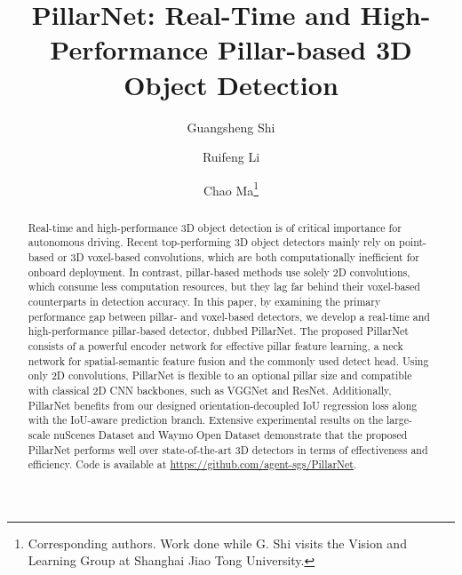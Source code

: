 \documentclass[runningheads]{llncs}
\begin{document}
\pagestyle{headings}
\mainmatter
\def\ECCVSubNumber{4346}  

\title{PillarNet: Real-Time and High-Performance Pillar-based 3D Object Detection} 

\begin{comment}
\titlerunning{ECCV-22 submission ID \ECCVSubNumber} 
\authorrunning{ECCV-22 submission ID \ECCVSubNumber} 
\author{Anonymous ECCV submission}
\institute{Paper ID \ECCVSubNumber}
\end{comment}


\author{Guangsheng Shi \and
Ruifeng Li\inst{1\star} \and
Chao Ma\thanks{Corresponding authors. Work done while G. Shi visits the Vision and Learning Group at Shanghai Jiao Tong University. }}


\maketitle

\begin{abstract}
Real-time and high-performance 3D object detection is of critical importance for autonomous driving. 
Recent top-performing 3D object detectors mainly rely on point-based or 3D voxel-based convolutions, which are both computationally inefficient for onboard deployment.
In contrast, pillar-based methods use solely 2D convolutions, which consume less computation resources, but they lag far behind their voxel-based counterparts in detection accuracy.
In this paper, by examining the primary performance gap between pillar- and voxel-based detectors, we develop a real-time and high-performance pillar-based detector, dubbed PillarNet.  
The proposed PillarNet consists of a powerful encoder network for effective pillar feature learning, a neck network for spatial-semantic feature fusion and the commonly used detect head.
Using only 2D convolutions, PillarNet is flexible to an optional pillar size and compatible with classical 2D CNN backbones, such as VGGNet and ResNet.
Additionally, PillarNet benefits from our designed orientation-decoupled IoU regression loss along with the IoU-aware prediction branch.
Extensive experimental results on the large-scale nuScenes Dataset and Waymo Open Dataset demonstrate that the proposed PillarNet performs well over state-of-the-art 3D detectors in terms of effectiveness and efficiency.
Code is available at \url{https://github.com/agent-sgs/PillarNet}.

\end{abstract}
\end{document}
